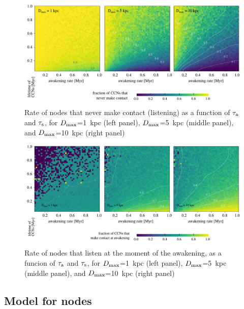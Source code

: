 \documentclass[crop]{CSLB}
\newcommand{\cetis}{nodes}
\begin{document}
\begin{figure} %
   \centering
   \includegraphics[width=\textwidth]{F_never_contact.pdf}
   \caption{
Rate of nodes that never make contact (listening) as a
   function of $\tau_{\rm a}$ and $\tau_{\rm s}$, for 
$D_{\rm max}$=1~kpc (left panel),
$D_{\rm max}$=5~kpc (middle panel), and
$D_{\rm max}$=10~kpc (right panel)
%
   }
   \label{F_never_contact}
\end{figure}
 
\begin{figure} %
   \centering
   \includegraphics[width=\textwidth]{F_C_at_A.pdf}
   \caption{
Rate of nodes that listen at the moment of the
   awakening, as a funcion of $\tau_{\rm a}$ and $\tau_{\rm s}$, for
$D_{\rm max}$=1~kpc (left panel),
$D_{\rm max}$=5~kpc (middle panel), and
$D_{\rm max}$=10~kpc (right panel)
%
   }
   \label{F_C_at_A}
\end{figure}
        

                     

\subsection{Model for \cetis{}}
\end{document}
